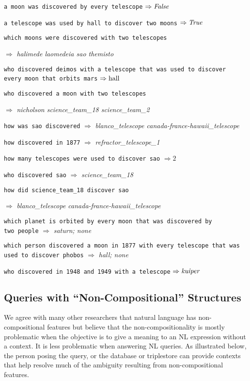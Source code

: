 \documentclass[../main.tex]{subfiles}
\begin{document}
\begin{refsection}
\noindent \texttt{a moon was discovered by every telescope} $\Rightarrow \operatorname{\mathit{False}}$

\noindent \texttt{a telescope was used by hall to discover two moons} $\Rightarrow \operatorname{\mathit{True}}$

\noindent \texttt{which moons were discovered with two telescopes}

$\Rightarrow$ \textit{halimede laomedeia sao themisto}

\noindent \texttt{who discovered deimos with a telescope that was used to discover \\ every moon that orbits mars} $\Rightarrow \operatorname{hall}$

\noindent \texttt{who discovered a moon with two telescopes}

$\Rightarrow$ \textit{nicholson science\_team\_18 science\_team\_2}

\noindent \texttt{how was sao discovered} $\Rightarrow$ \textit{blanco\_telescope canada-france-hawaii\_telescope}

\noindent \texttt{how discovered in 1877} $\Rightarrow$ \textit{refractor\_telescope\_1}

\noindent \texttt{how many telescopes were used to discover sao} $\Rightarrow 2$

\noindent \texttt{who discovered sao}  $\Rightarrow$ \textit{science\_team\_18}

\noindent \texttt{how did science\_team\_18 discover sao}

$\Rightarrow$ \textit{blanco\_telescope canada-france-hawaii\_telescope}

\noindent \texttt{which planet is orbited by every moon that was discovered by \\ two people}
$\Rightarrow$ \textit{saturn; none}

\noindent \texttt{which person discovered a moon in 1877 with every telescope that was used to discover phobos} $\Rightarrow$ \textit{hall; none}

\noindent \texttt{who discovered in 1948 and 1949 with a telescope} $\Rightarrow \operatorname{\mathit{kuiper}}$

\subsection{Queries with ``Non-Compositional'' Structures}
\label{webist2019conf:noncompositional}

We agree with many other researchers that natural language has non-compositional features but believe that the non-compositionality is mostly problematic when the objective is to give a meaning to an NL expression without a context. It is less problematic when answering NL queries. As illustrated below, the person posing the query, or the database or triplestore can provide contexts that help resolve much of the ambiguity resulting from non-compositional features.


\end{refsection}
\end{document}
